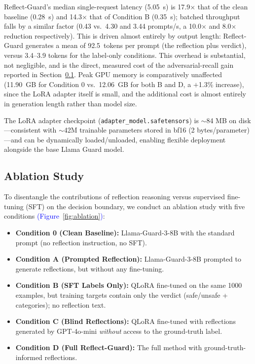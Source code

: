 \documentclass[superintelligence,article,accept,moreauthors]{Definitions/mdpi}
\newcommand{\authchg}[1]{\textcolor{blue}{#1}}
\begin{document}
Reflect-Guard's median single-request latency (5.05~s) is 17.9$\times$ that of the clean baseline (0.28~s) and 14.3$\times$ that of Condition B (0.35~s); batched throughput falls by a similar factor (0.43 vs.\ 4.30 and 3.44 prompts/s, a 10.0$\times$ and 8.0$\times$ reduction respectively). This is driven almost entirely by output length: Reflect-Guard generates a mean of 92.5~tokens per prompt (the reflection plus verdict), versus 3.4--3.9 tokens for the label-only conditions. This overhead is substantial, not negligible, and is the direct, measured cost of the adversarial-recall gain reported in Section~\ref{sec:ablation}. Peak GPU memory is comparatively unaffected (11.90~GB for Condition 0 vs.\ 12.06~GB for both B and D, a $+$1.3\% increase), since the LoRA adapter itself is small, and the additional cost is almost entirely in generation length rather than model size.

The LoRA adapter checkpoint (\texttt{adapter\_model.safetensors}) is $\sim$84 MB on disk---consistent with $\sim$42M trainable parameters stored in bf16 (2 bytes/parameter)---and can be dynamically loaded/unloaded, enabling flexible deployment alongside the base Llama Guard model.

\subsection{Ablation Study}
\label{sec:ablation}

To disentangle the contributions of reflection reasoning versus supervised fine-tuning (SFT) on the decision boundary, we conduct an ablation study with five conditions \authchg{(Figure~\ref{fig:ablation})}:

\begin{itemize}[leftmargin=*, nosep]
  \item \textbf{Condition 0 (Clean Baseline):} Llama-Guard-3-8B with the standard prompt (no reflection instruction, no SFT).
  \item \textbf{Condition A (Prompted Reflection):} Llama-Guard-3-8B prompted to generate reflections, but without any fine-tuning.
  \item \textbf{Condition B (SFT Labels Only):} QLoRA fine-tuned on the same 1000 examples, but training targets contain only the verdict (safe/unsafe + categories); no reflection text.
  \item \textbf{Condition C (Blind Reflections):} QLoRA fine-tuned with reflections generated by GPT-4o-mini \emph{without} access to the ground-truth label.
  \item \textbf{Condition D (Full Reflect-Guard):} The full method with ground-truth-informed reflections.
\end{itemize}
\end{document}
